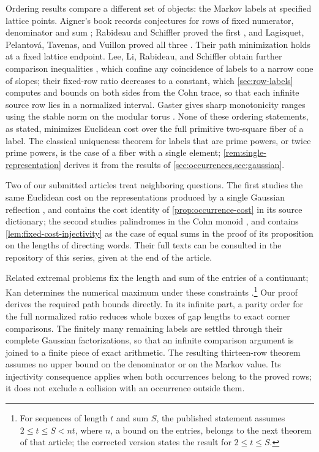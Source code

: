Ordering results compare a different set of objects: the Markov labels
at specified lattice points. Aigner's book records conjectures for rows of
fixed numerator, denominator and sum \cite[Section~10.1]{Aigner2013}; Rabideau and
Schiffler proved the first \cite{RabideauSchiffler2020}, and Lagisquet,
Pelantov\'a, Tavenas, and Vuillon proved all three
\cite{LagisquetEtAl2021}. Their path minimization holds at a fixed lattice
endpoint. Lee, Li, Rabideau, and Schiffler obtain further comparison
inequalities \cite{LeeEtAl2023}, which confine any coincidence of labels to
a narrow cone of slopes; their fixed-row ratio decreases to a constant,
which \cref{sec:row-labels} computes and bounds on both sides from the Cohn
trace, so that each infinite source row lies in a normalized interval. Gaster gives sharp monotonicity ranges using the
stable norm on the modular torus \cite{Gaster2022}. None of these ordering
statements, as stated, minimizes Euclidean cost over the full primitive
two-square fiber of a label. The classical uniqueness theorem for labels
that are prime powers, or twice prime powers, is the case of a fiber with a
single element; \cref{rem:single-representation} derives it from the
results of \cref{sec:occurrences,sec:gaussian}.

Two of our submitted articles treat neighboring questions. The first
studies the same Euclidean cost on the representations produced by a single
Gaussian reflection \cite{DutykhVuillon2026Endpoint}, and contains the cost
identity of \cref{prop:occurrence-cost} in its source dictionary; the second
studies palindromes in the Cohn monoid \cite{DutykhVuillon2026Reflections},
and contains \cref{lem:fixed-cost-injectivity} as the case of equal sums in
the proof of its proposition on the lengths of directing words. Their full texts can be consulted in the repository of
this series, given at the end of the article.

Related extremal problems fix the length and sum of the entries of a
continuant; Kan determines the numerical maximum under these constraints
\cite[Theorem~5]{Kan2012}.\footnote{For sequences of length $t$ and sum $S$,
the published statement assumes $2\leqslant t\leqslant S<nt$, where $n$, a bound
on the entries, belongs to the next theorem of that article; the corrected
version \cite[Theorem~3.5]{Kan2021} states the result for
$2\leqslant t\leqslant S$.}
Our proof derives the required path bounds
directly. In its infinite part, a parity order for the full normalized
ratio reduces whole boxes of gap lengths to exact corner comparisons.
The finitely many remaining labels are settled through their complete
Gaussian factorizations, so that an infinite comparison argument is
joined to a finite piece of exact arithmetic. The resulting thirteen-row
theorem assumes no upper bound on the denominator or on the Markov
value. Its injectivity consequence applies when both occurrences
belong to the proved rows; it does not exclude a collision with an
occurrence outside them.
